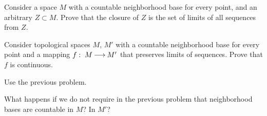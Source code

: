 \documentclass[12pt]{article}
\begin{document}
\begin{zadacha} 
Consider a space $M$ with a countable neighborhood base for every
point, and an arbitrary  $Z\subset M$. Prove that the
closure of $Z$ is the set of limits of all sequences from $Z$.
\end{zadacha}

\begin{zadacha}[!]\label{lim.seq}
Consider topological spaces $M$, $M'$ with a countable neighborhood
base for every point and a mapping $f:\; M {\:\longrightarrow\:} M'$ that preserves
limits of sequences. Prove that $f$ is continuous.
\end{zadacha}

\begin{ukazanie}
Use the previous problem.
\end{ukazanie}

\begin{zadacha}[*] 
What happens if we do not require in the previous problem that
neighborhood bases are countable in $M$? In $M'$?
\end{zadacha}
\end{document}
